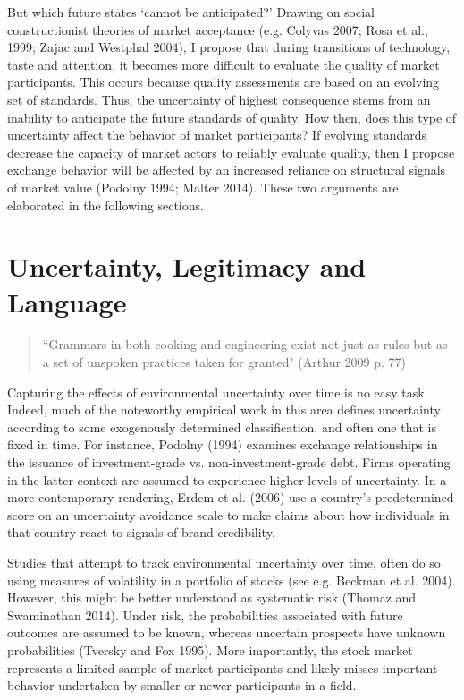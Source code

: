 But which future states `cannot be anticipated?' Drawing on social constructionist theories of market acceptance (e.g. Colyvas 2007; Rosa et al., 1999; Zajac and Westphal 2004), I propose that during transitions of technology, taste and attention, it becomes more difficult to evaluate the quality of market participants. This occurs because quality assessments are based on an evolving set of standards. Thus, the uncertainty of highest consequence stems from an inability to anticipate the future standards of quality. How then, does this type of uncertainty affect the behavior of market participants? If evolving standards decrease the capacity of market actors to reliably evaluate quality, then I propose exchange behavior will be affected by an increased reliance on structural signals of market value (Podolny 1994; Malter 2014). These two arguments are elaborated in the following sections.

\section{Uncertainty, Legitimacy and Language}

\begin{small}
\begin{quote}
``Grammars in both cooking and engineering exist not just as rules but as a set of unspoken practices taken for granted" (Arthur 2009 p. 77)
\end{quote}
\end{small}

Capturing the effects of environmental uncertainty over time is no easy task. Indeed, much of the noteworthy empirical work in this area defines uncertainty according to some exogenously determined classification, and often one that is fixed in time. For instance, Podolny (1994) examines exchange relationships in the issuance of investment-grade vs. non-investment-grade debt. Firms operating in the latter context are assumed to experience higher levels of uncertainty. In a more contemporary rendering, Erdem et al. (2006) use a country's predetermined score on an uncertainty avoidance scale to make claims about how individuals in that country react to signals of brand credibility. 

Studies that attempt to track environmental uncertainty over time, often do so using measures of volatility in a portfolio of stocks (see e.g. Beckman et al. 2004). However, this might be better understood as systematic risk (Thomaz and Swaminathan 2014). Under risk, the probabilities associated with future outcomes are assumed to be known, whereas uncertain prospects have unknown probabilities (Tversky and Fox 1995). More importantly, the stock market represents a limited sample of market participants and likely misses important behavior undertaken by smaller or newer participants in a field. 

